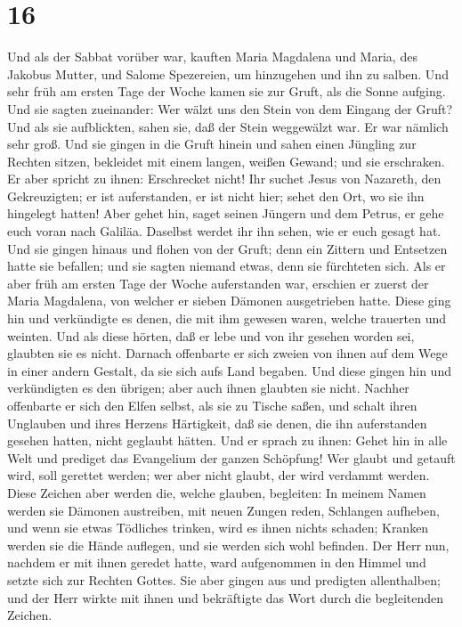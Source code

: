 \hypertarget{section-15}{%
\section{16}\label{section-15}}

 Und als der Sabbat vorüber war, kauften Maria Magdalena
und Maria, des Jakobus Mutter, und Salome Spezereien, um hinzugehen und
ihn zu salben.  Und sehr früh am ersten Tage der Woche
kamen sie zur Gruft, als die Sonne aufging.  Und sie
sagten zueinander: Wer wälzt uns den Stein von dem Eingang der Gruft?
 Und als sie aufblickten, sahen sie, daß der Stein
weggewälzt war. Er war nämlich sehr groß.  Und sie gingen
in die Gruft hinein und sahen einen Jüngling zur Rechten sitzen,
bekleidet mit einem langen, weißen Gewand; und sie erschraken.
 Er aber spricht zu ihnen: Erschrecket nicht! Ihr suchet
Jesus von Nazareth, den Gekreuzigten; er ist auferstanden, er ist nicht
hier; sehet den Ort, wo sie ihn hingelegt hatten!  Aber
gehet hin, saget seinen Jüngern und dem Petrus, er gehe euch voran nach
Galiläa. Daselbst werdet ihr ihn sehen, wie er euch gesagt hat.
 Und sie gingen hinaus und flohen von der Gruft; denn ein
Zittern und Entsetzen hatte sie befallen; und sie sagten niemand etwas,
denn sie fürchteten sich.  Als er aber früh am ersten Tage
der Woche auferstanden war, erschien er zuerst der Maria Magdalena, von
welcher er sieben Dämonen ausgetrieben hatte.  Diese ging
hin und verkündigte es denen, die mit ihm gewesen waren, welche
trauerten und weinten.  Und als diese hörten, daß er lebe
und von ihr gesehen worden sei, glaubten sie es nicht. 
Darnach offenbarte er sich zweien von ihnen auf dem Wege in einer andern
Gestalt, da sie sich aufs Land begaben.  Und diese gingen
hin und verkündigten es den übrigen; aber auch ihnen glaubten sie nicht.
 Nachher offenbarte er sich den Elfen selbst, als sie zu
Tische saßen, und schalt ihren Unglauben und ihres Herzens Härtigkeit,
daß sie denen, die ihn auferstanden gesehen hatten, nicht geglaubt
hätten.  Und er sprach zu ihnen: Gehet hin in alle Welt
und prediget das Evangelium der ganzen Schöpfung!  Wer
glaubt und getauft wird, soll gerettet werden; wer aber nicht glaubt,
der wird verdammt werden.  Diese Zeichen aber werden die,
welche glauben, begleiten: In meinem Namen werden sie Dämonen
austreiben, mit neuen Zungen reden,  Schlangen aufheben,
und wenn sie etwas Tödliches trinken, wird es ihnen nichts schaden;
Kranken werden sie die Hände auflegen, und sie werden sich wohl
befinden.  Der Herr nun, nachdem er mit ihnen geredet
hatte, ward aufgenommen in den Himmel und setzte sich zur Rechten
Gottes.  Sie aber gingen aus und predigten allenthalben;
und der Herr wirkte mit ihnen und bekräftigte das Wort durch die
begleitenden Zeichen.
